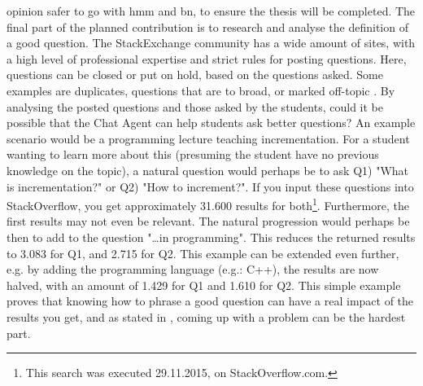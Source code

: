 opinion safer to go with \gls{hmm} and \gls{bn}, to ensure the thesis will be completed. 
\vspace{0.5em}\newline
The final part of the planned contribution is to research and analyse the definition of a good question. The StackExchange community has a wide amount of sites, with a high level 
of professional expertise and strict rules for posting questions. Here, questions can be closed or put on hold, based on the questions asked. Some examples are duplicates, questions 
that are to broad, or marked off-topic \cite{Stackoverflow.com2015,CommunityWiki2015}. By analysing the posted questions and those asked by the students, could it be possible 
that the Chat Agent can help students ask better questions? An example scenario would be a programming lecture teaching incrementation. For a student wanting to learn more about this 
(presuming the student have no previous knowledge on the topic), a natural question would perhaps be to ask Q1) "What is incrementation?" or Q2) "How to increment?". If you input 
these questions into StackOverflow, you get approximately 31.600 results for both\footnote{This search was executed 29.11.2015, on StackOverflow.com.}. Furthermore, the first results 
may not even be relevant. The natural progression would perhaps be then to add to the question "\ldots in programming". This reduces the returned results to 3.083 for Q1, and 2.715 
for Q2. This example can be extended even further, e.g. by adding the programming language (e.g.: C++), the results are now halved, with an amount of 1.429 for Q1 and 1.610 for Q2. 
This simple example proves that knowing how to phrase a good question can have a real impact of the results you get, and as stated in \cite{Lucky2011}, coming up with a problem can be 
the hardest part.

